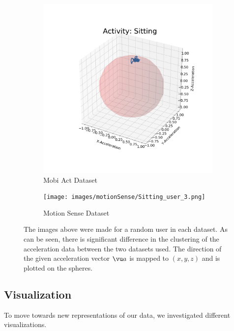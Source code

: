 \begin{figure}[H]
\begin{subfigure}{.5\textwidth}
  \centering
    \includegraphics[width = \textwidth]{images/mobiAct/sitting.png}
    \caption{Mobi Act Dataset}
    \label{fig:mobiAct_sitting_comp}
\end{subfigure}
\begin{subfigure}{.5\textwidth}
  \centering
  \centering
  \texttt{[image: images/motionSense/Sitting\_user\_3.png]}  
  \caption{Motion Sense Dataset}
  \label{fig:motionSense_sitting_comp}
\end{subfigure}
\caption{The images above were made for a random user in each dataset. As can be seen, there is significant difference in the clustering of the acceleration data between the two datasets used. The direction of the given acceleration vector $\vu a$ is mapped to $(x,y,z)$ and is plotted on the spheres.}
\label{fig:sitting_comp}
\end{figure}

\subsection{Visualization}
\label{sub:visual}
To move towards new representations of our data, we investigated different visualizations.

